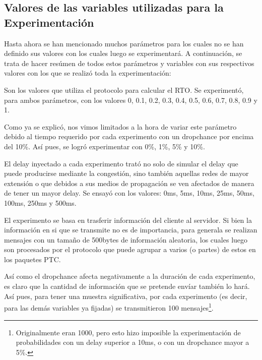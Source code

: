 \subsection{Valores de las variables utilizadas para la Experimentaci\'on}\label{sec:variables_metricas:variables}
\par Hasta ahora se han mencionado muchos par\'ametros para los cuales no se han
definido sus valores con los cuales luego se experimentar\'a. A continuaci\'on,
se trata de hacer res\'umen de todos estos par\'ametros y variables con sus
respectivos valores con los que se realiz\'o toda la experimentaci\'on:

\begin{description}

    \bigskip
    \item[$\alpha$/$\beta$:] Son los valores que utiliza el protocolo para
        calcular el RTO. Se experiment\'o, para ambos par\'ametros, con los
        valores 0, 0.1, 0.2, 0.3, 0.4, 0.5, 0.6, 0.7, 0.8, 0.9 y 1.

    \bigskip
    \item[DropChance ($\phi$):] Como ya se explic\'o, nos vimos limitados a la
        hora de variar este par\'ametro debido al tiempo requerido por cada
        experimento con un dropchance por encima del 10\%. As\'i pues, se
        logr\'o experimentar con 0\%, 1\%, 5\% y 10\%.

    \bigskip
    \item[Delay ($\delta$):] El delay inyectado a cada experimento trat\'o no
        solo de simular el delay que puede producirse mediante la congesti\'on,
        sino tambi\'en aquellas redes de mayor extensi\'on o que debidos a sus
        medios de propagaci\'on se ven afectados de manera de tener un mayor
        delay. Se ensay\'o con los valores: 0ms, 5ms, 10ms, 25ms, 50ms, 100ms,
        250ms y 500ms.

    \bigskip
    \item[Tama\~no los mensajes:] El experimento se basa en trasferir
        informaci\'on del cliente al servidor. Si bien la informaci\'on en si
        que se transmite no es de importancia, para generala se realizan
        mensajes con un tama\~no de 500bytes de informaci\'on aleatoria, los
        cuales luego son procesados por el protocolo que puede agrupar a varios
        (o partes) de estos en los paquetes PTC.

    \bigskip
    \item[Cantidad de mensajes:] As\'i como el dropchance afecta negativamente a
        la duraci\'on de cada experimento, es claro que la cantidad de
        informaci\'on que se pretende env\'iar tambi\'en lo har\'a. As\'i pues,
        para tener una muestra significativa, por cada experimento (es decir,
        para las dem\'as variables ya fijadas) se transmitieron 100
        mensajes\footnote{Originalmente eran 1000, pero esto hizo imposible la
        experimentaci\'on de probabilidades con un delay superior a 10ms, o con
        un dropchance mayor a 5\%.}.

\end{description}

